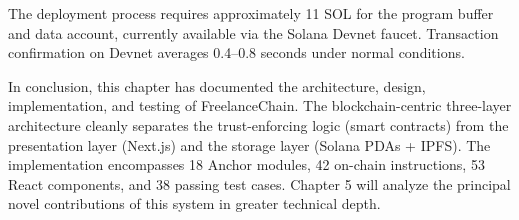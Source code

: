 The deployment process requires approximately 11 SOL for the program buffer and data account, currently available via the Solana Devnet faucet. Transaction confirmation on Devnet averages 0.4--0.8 seconds under normal conditions.

In conclusion, this chapter has documented the architecture, design, implementation, and testing of FreelanceChain. The blockchain-centric three-layer architecture cleanly separates the trust-enforcing logic (smart contracts) from the presentation layer (Next.js) and the storage layer (Solana PDAs + IPFS). The implementation encompasses 18 Anchor modules, 42 on-chain instructions, 53 React components, and 38 passing test cases. Chapter 5 will analyze the principal novel contributions of this system in greater technical depth.

